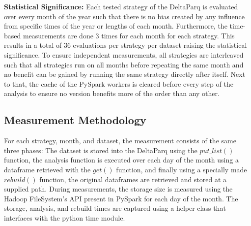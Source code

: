 \textbf{Statistical Significance:} Each tested strategy of the DeltaParq is evaluated over every month of the year such that there is no bias created by 
any influence from specific times of the year or lengths of each month. Furthermore, the time-based measurements are done 3 times for each month for 
each strategy. This results in a total of 36 evaluations per strategy per dataset raising the statistical significance. To ensure independent measurements, 
all strategies are interleaved such that all strategies run on all months before repeating the same month and no benefit can be gained by running the same 
strategy directly after itself. Next to that, the cache of the PySpark workers is cleared before every 
step of the analysis to ensure no version benefits more of the order than any other.

\subsection{Measurement Methodology}

For each strategy, month, and dataset, the measurement consists of the same three phases: The dataset is stored into the DeltaParq using the 
$put\_list()$ function, the analysis function is executed over each day of the month using a dataframe retrieved with the $get()$ 
function, and finally using a specially made $rebuild()$ function, the original dataframes are retrieved and stored at a supplied path. 
During measurements, the storage size is measured using the Hadoop FileSystem's API present in PySpark for each day of the month. The storage, 
analysis, and rebuild times are captured using a helper class that interfaces with the python time module.
